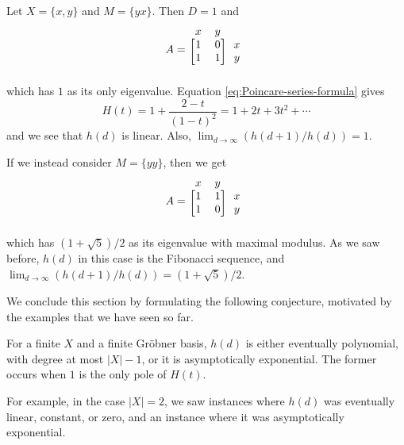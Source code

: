 \begin{example}
	Let $X = \{x,y\}$ and $M = \{yx\}$. Then $D = 1$ and
	\[
		A = 
		\begin{blockarray}{ccc}
		x & y &\\
		\begin{block}{[cc]c}
		1 & 0 & x\\
		1 & 1 & y\\
		\end{block}
		\end{blockarray}
	\]
	which has $1$ as its only eigenvalue. Equation \eqref{eq:Poincare-series-formula} gives
	\[
		H(t) = 1 + \frac{2-t}{(1-t)^2} = 1 + 2t + 3t^2 + \cdots
	\]
	and we see that $h(d)$ is linear. Also, $\lim_{d\to \infty} (h(d+1)/h(d)) = 1$.
	
	If we instead consider $M = \{yy\}$, then we get
	\[
		A = 
		\begin{blockarray}{ccc}
		x & y &\\
		\begin{block}{[cc]c}
		1 & 1 & x\\
		1 & 0 & y\\
		\end{block}
		\end{blockarray}
	\]
	which has $(1+\sqrt{5})/2$ as its eigenvalue with maximal modulus. As we saw before, $h(d)$ in this case is the Fibonacci sequence, and $\lim_{d\to \infty} (h(d+1) / h(d)) = (1+\sqrt{5})/2$.
\end{example}

We conclude this section by formulating the following conjecture, motivated by the examples that we have seen so far.
\begin{conj}
	For a finite $X$ and a finite Gr\"obner basis, $h(d)$ is either eventually polynomial, with degree at most $|X| - 1$, or it is asymptotically exponential. The former occurs when $1$ is the only pole of $H(t)$.
\end{conj}
For example, in the case $|X|=2$, we saw instances where $h(d)$ was eventually linear, constant, or zero, and an instance where it was asymptotically exponential.
